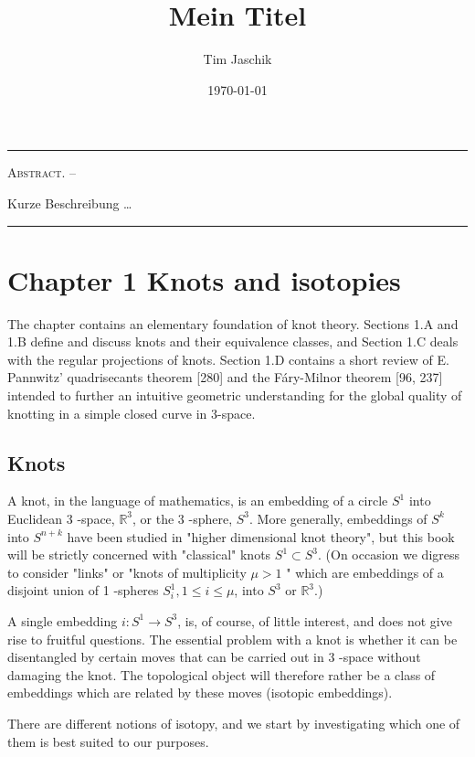 \documentclass[10pt, letterpaper]{article}
\title{Mein Titel}
\author{Tim Jaschik}
\date{\today}
\renewenvironment{abstract}
  {
    \begin{adjustwidth}{1.5cm}{1.5cm}
    \small
    \textsc{Abstract. –}%
  }
  {
    \end{adjustwidth}
  }
\begin{document}
\maketitle
\rule{\textwidth}{0.5pt}
\begin{abstract}
Kurze Beschreibung …
\end{abstract}
\rule{\textwidth}{0.5pt}
\vspace{0.5cm}

\tableofcontents

\pagebreak


\section{Chapter 1 Knots and isotopies}

The chapter contains an elementary foundation of knot theory. Sections 1.A and 1.B define and discuss knots and their equivalence classes, and Section 1.C deals with the regular projections of knots. Section 1.D contains a short review of E. Pannwitz' quadrisecants theorem [280] and the Fáry-Milnor theorem [96, 237] intended to further an intuitive geometric understanding for the global quality of knotting in a simple closed curve in 3-space.



\subsection{Knots}

A knot, in the language of mathematics, is an embedding of a circle $S^{1}$ into Euclidean 3 -space, $\mathbb{R}^{3}$, or the 3 -sphere, $S^{3}$. More generally, embeddings of $S^{k}$ into $S^{n+k}$ have been studied in "higher dimensional knot theory", but this book will be strictly concerned with "classical" knots $S^{1} \subset S^{3}$. (On occasion we digress to consider "links" or "knots of multiplicity $\mu>1$ " which are embeddings of a disjoint union of 1 -spheres $S_{i}^{1}, 1 \leq i \leq \mu$, into $S^{3}$ or $\mathbb{R}^{3}$.)

A single embedding $i: S^{1} \rightarrow S^{3}$, is, of course, of little interest, and does not give rise to fruitful questions. The essential problem with a knot is whether it can be disentangled by certain moves that can be carried out in 3 -space without damaging the knot. The topological object will therefore rather be a class of embeddings which are related by these moves (isotopic embeddings).

There are different notions of isotopy, and we start by investigating which one of them is best suited to our purposes.
\end{document}
